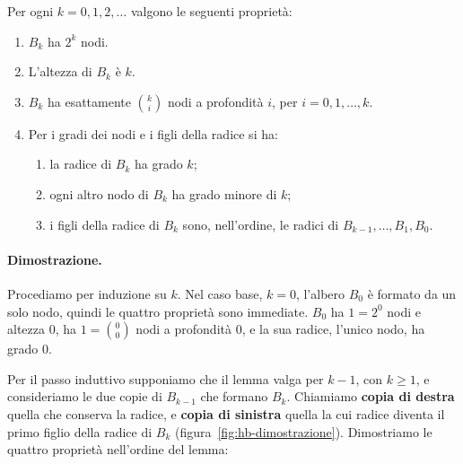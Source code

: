 \begin{lemma}\label{lem:hb-proprieta}
Per ogni $k = 0, 1, 2, \ldots$ valgono le seguenti proprietà:
\begin{enumerate}
    \item $B_k$ ha $2^k$ nodi.
    \item L'altezza di $B_k$ è $k$.
    \item $B_k$ ha esattamente $\binom{k}{i}$ nodi a profondità $i$, per $i = 0, 1, \ldots, k$.
    \item Per i gradi dei nodi e i figli della radice si ha:
    \begin{enumerate}[label=(\alph*)]
        \item la radice di $B_k$ ha grado $k$;
        \item ogni altro nodo di $B_k$ ha grado minore di $k$;
        \item i figli della radice di $B_k$ sono, nell'ordine, le radici di $B_{k-1}, \ldots, B_1, B_0$.
    \end{enumerate}
\end{enumerate}
\end{lemma}

\paragraph{Dimostrazione.}
Procediamo per induzione su $k$. Nel caso base, $k = 0$, l'albero $B_0$ è formato da un solo nodo, quindi le quattro proprietà sono immediate. $B_0$ ha $1 = 2^0$ nodi e altezza $0$, ha $1 = \binom{0}{0}$ nodi a profondità $0$, e la sua radice, l'unico nodo, ha grado $0$.

Per il passo induttivo supponiamo che il lemma valga per $k-1$, con $k \ge 1$, e consideriamo le due copie di $B_{k-1}$ che formano $B_k$. Chiamiamo \textbf{copia di destra} quella che conserva la radice, e \textbf{copia di sinistra} quella la cui radice diventa il primo figlio della radice di $B_k$ (figura~\ref{fig:hb-dimostrazione}). Dimostriamo le quattro proprietà nell'ordine del lemma:

